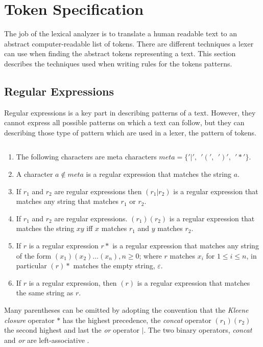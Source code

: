 \section{Token Specification}
The job of the lexical analyzer is to translate a human readable text to an
abstract computer-readable list of tokens. There are different techniques a
lexer can use when finding the abstract tokens representing a text. This section
describes the techniques used when writing rules for the tokens patterns.

\subsection{Regular Expressions}
Regular expressions is a key part in describing patterns of a text. However,
they cannot express all possible patterns on which a text can follow, but they
can describing those type of pattern which are used in a lexer, the pattern of
tokens.

\begin{definition}\label{regexp} $ $\\
\begin{enumerate}
  \item The following characters are meta characters $meta = \{ '|', ~~ '(', ~~ ')', ~~ '*' \}$.
  \item A character $a \notin meta$ is a regular expression that matches the 
      string $a$.
  \item If $r_1$ and $r_2$ are regular expressions then $(r_1 | r_2)$ is a 
      regular expression that matches any string that matches $r_1$ or $r_2$.
  \item If $r_1$ and $r_2$ are regular expressions. $(r_1)(r_2)$ is a regular
      expression that matches the string $xy$ iff $x$ matches $r_1$
      and $y$ matches $r_2$.
  \item If $r$ is a regular expression $r*$ is a regular expression that
      matches any string of the form $(x_1)(x_2) \dots  (x_n), n \geq 0$;
      where $r$ matches $x_i$ for $1 \leq i \leq n$, in particular $(r)*$ 
      matches the empty string, $\varepsilon$.
  \item If $r$ is a regular expression, then $(r)$ is a regular expression that
      matches the same string as $r$.
\end{enumerate}
\qeda
\end{definition}

Many parentheses can be omitted by adopting the convention that the \emph{Kleene
closure} operator $*$ has the highest precedence, the \emph{concat} operator
$(r_1)(r_2)$ the second highest and last the \emph{or} operator $|$. The two
binary operators, \emph{concat} and \emph{or} are left-associative \cite{Aho1990}.

